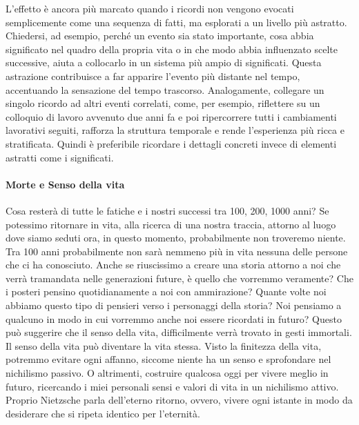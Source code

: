 \documentclass[12pt]{book} %
\begin{document}
\begin{itemize}
L’effetto è ancora più marcato quando i ricordi non vengono evocati semplicemente come una sequenza di fatti, ma esplorati a un livello più astratto. Chiedersi, ad esempio, perché un evento sia stato importante, cosa abbia significato nel quadro della propria vita o in che modo abbia influenzato scelte successive, aiuta a collocarlo in un sistema più ampio di significati. Questa astrazione contribuisce a far apparire l’evento più distante nel tempo, accentuando la sensazione del tempo trascorso. Analogamente, collegare un singolo ricordo ad altri eventi correlati, come, per esempio, riflettere su un colloquio di lavoro avvenuto due anni fa e poi ripercorrere tutti i cambiamenti lavorativi seguiti, rafforza la struttura temporale e rende l’esperienza più ricca e stratificata. Quindi è preferibile ricordare i dettagli concreti invece di elementi astratti come i significati.
\end{itemize}

\paragraph{Morte e Senso della vita}

Cosa resterà di tutte le fatiche e i nostri successi tra 100, 200, 1000 anni? Se potessimo ritornare in vita, alla ricerca di una nostra traccia, attorno
al luogo dove siamo seduti ora, in questo momento, probabilmente non troveremo niente. Tra 100 anni probabilmente non sarà nemmeno più in vita nessuna delle persone che ci ha conosciuto. Anche se riuscissimo a creare una storia attorno a noi che verrà tramandata nelle generazioni future, è quello che vorremmo veramente? Che i posteri pensino quotidianamente a noi con ammirazione? Quante volte noi abbiamo questo tipo di pensieri verso i personaggi della storia? Noi pensiamo a qualcuno in modo in cui vorremmo anche noi essere ricordati in futuro? 
Questo può suggerire che il senso della vita, difficilmente verrà trovato in gesti immortali. Il senso della vita può diventare la vita stessa. 
Visto la finitezza della vita, potremmo evitare ogni affanno, siccome niente ha un senso e sprofondare nel nichilismo passivo. O altrimenti, costruire qualcosa oggi per vivere meglio in futuro, ricercando i miei personali sensi e valori di vita in un nichilismo attivo.
Proprio Nietzsche parla dell'eterno ritorno, ovvero, vivere ogni istante in modo da desiderare che si ripeta identico per l'eternità.
\end{document}
